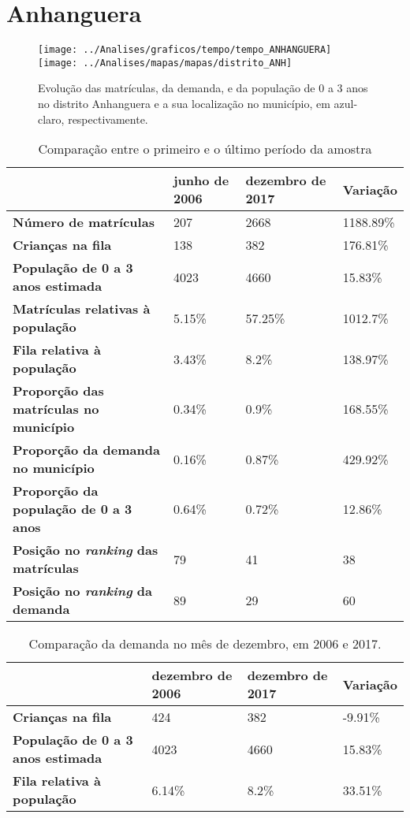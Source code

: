 \section{Anhanguera}
\begin{figure}[H]
\centering
\texttt{[image: ../Analises/graficos/tempo/tempo\_ANHANGUERA]}
\texttt{[image: ../Analises/mapas/mapas/distrito\_ANH]}
\caption{Evolução das matrículas, da demanda, e da população de 0 a 3 anos no distrito Anhanguera e a sua localização no município, em azul-claro, respectivamente.}
\end{figure}
\begin{table}[H]
\begin{tabular}{l|l|l|l}
\textbf{}                                      & \textbf{junho de 2006}       & \textbf{dezembro de 2017}    & \textbf{Variação} \\ \hline
\textbf{Número de matrículas}                  & 207 & 2668 & 1188.89\% \\ \hline
\textbf{Crianças na fila}                      & 138 & 382 & 176.81\% \\ \hline
\textbf{População de 0 a 3 anos estimada}      & 4023 & 4660 & 15.83\% \\ \hline
\textbf{Matrículas relativas à população}      & 5.15\% & 57.25\% & 1012.7\% \\ \hline
\textbf{Fila relativa à população}             & 3.43\% & 8.2\% & 138.97\% \\ \hline
\textbf{Proporção das matrículas no município} & 0.34\% & 0.9\% & 168.55\% \\ \hline
\textbf{Proporção da demanda no município}     & 0.16\% & 0.87\% & 429.92\% \\ \hline
\textbf{Proporção da população de 0 a 3 anos}  & 0.64\% & 0.72\% & 12.86\% \\ \hline
\textbf{Posição no \textit{ranking} das matrículas}     & 79 & 41 & 38 \\ \hline
\textbf{Posição no \textit{ranking} da demanda}         & 89 & 29 & 60 \\ 
\end{tabular}
\caption{Comparação entre o primeiro e o último período da amostra}
\end{table}
\begin{table}[H]
\begin{tabular}{l|l|l|l}
\textbf{}                                 & \textbf{dezembro de 2006} & \textbf{dezembro de 2017} & \textbf{Variação} \\ \hline
\textbf{Crianças na fila}                      & 424 & 382 & -9.91\% \\ \hline
\textbf{População de 0 a 3 anos estimada}      & 4023 & 4660 & 15.83\% \\ \hline
\textbf{Fila relativa à população}             & 6.14\% & 8.2\% & 33.51\% \\
\end{tabular}
\caption{Comparação da demanda no mês de dezembro, em 2006 e 2017.}
\end{table}
